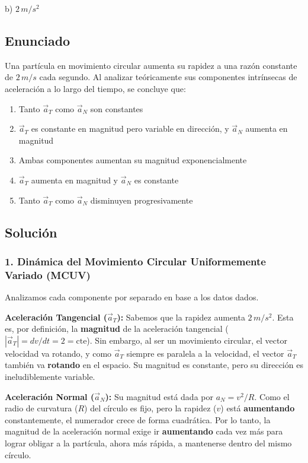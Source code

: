 \documentclass[12pt, a4paper]{article}
\begin{document}
\begin{tcolorbox}[colback=green!5!white, colframe=green!50!black, title=Respuesta Final]
\centering \Large b) $2\,\si{m/s^2}$
\end{tcolorbox}

\newpage

\subsection*{Enunciado}
Una partícula en movimiento circular aumenta su rapidez a una razón constante de $2\,\si{m/s}$ cada segundo. Al analizar teóricamente sus componentes intrínsecas de aceleración a lo largo del tiempo, se concluye que:
\begin{enumerate}[label=\alph*)]
    \item Tanto $\vec{a}_T$ como $\vec{a}_N$ son constantes
    \item $\vec{a}_T$ es constante en magnitud pero variable en dirección, y $\vec{a}_N$ aumenta en magnitud
    \item Ambas componentes aumentan su magnitud exponencialmente
    \item $\vec{a}_T$ aumenta en magnitud y $\vec{a}_N$ es constante
    \item Tanto $\vec{a}_T$ como $\vec{a}_N$ disminuyen progresivamente
\end{enumerate}

\subsection*{Solución}

\subsubsection*{1. Dinámica del Movimiento Circular Uniformemente Variado (MCUV)}
Analizamos cada componente por separado en base a los datos dados.

\textbf{Aceleración Tangencial ($\vec{a}_T$):}
Sabemos que la rapidez aumenta $2\,\si{m/s^2}$. Esta es, por definición, la \textbf{magnitud} de la aceleración tangencial ($|\vec{a}_T| = dv/dt = 2 = \text{cte}$). 
Sin embargo, al ser un movimiento circular, el vector velocidad va rotando, y como $\vec{a}_T$ siempre es paralela a la velocidad, el vector $\vec{a}_T$ también va \textbf{rotando} en el espacio. Su magnitud es constante, pero su dirección es ineludiblemente variable.

\textbf{Aceleración Normal ($\vec{a}_N$):}
Su magnitud está dada por $a_N = v^2 / R$.
Como el radio de curvatura ($R$) del círculo es fijo, pero la rapidez ($v$) está \textbf{aumentando} constantemente, el numerador crece de forma cuadrática. Por lo tanto, la magnitud de la aceleración normal exige ir \textbf{aumentando} cada vez más para lograr obligar a la partícula, ahora más rápida, a mantenerse dentro del mismo círculo.
\end{document}
